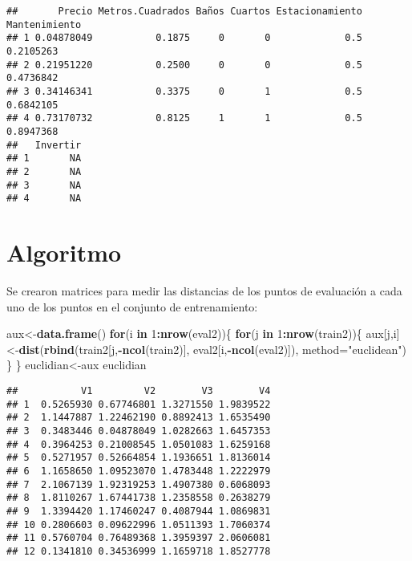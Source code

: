 \documentclass[]{article}
\newenvironment{Shaded}{\begin{snugshade}}{\end{snugshade}}
\newcommand{\KeywordTok}[1]{\textcolor[rgb]{0.13,0.29,0.53}{\textbf{#1}}}
\newcommand{\DataTypeTok}[1]{\textcolor[rgb]{0.13,0.29,0.53}{#1}}
\newcommand{\DecValTok}[1]{\textcolor[rgb]{0.00,0.00,0.81}{#1}}
\newcommand{\StringTok}[1]{\textcolor[rgb]{0.31,0.60,0.02}{#1}}
\newcommand{\ControlFlowTok}[1]{\textcolor[rgb]{0.13,0.29,0.53}{\textbf{#1}}}
\newcommand{\OperatorTok}[1]{\textcolor[rgb]{0.81,0.36,0.00}{\textbf{#1}}}
\newcommand{\NormalTok}[1]{#1}
\begin{document}
\begin{verbatim}
##       Precio Metros.Cuadrados Baños Cuartos Estacionamiento Mantenimiento
## 1 0.04878049           0.1875     0       0             0.5     0.2105263
## 2 0.21951220           0.2500     0       0             0.5     0.4736842
## 3 0.34146341           0.3375     0       1             0.5     0.6842105
## 4 0.73170732           0.8125     1       1             0.5     0.8947368
##   Invertir
## 1       NA
## 2       NA
## 3       NA
## 4       NA
\end{verbatim}

\section{Algoritmo}\label{algoritmo}

Se crearon matrices para medir las distancias de los puntos de
evaluación a cada uno de los puntos en el conjunto de entrenamiento:

\begin{Shaded}
\begin{Highlighting}[]
\NormalTok{aux<-}\KeywordTok{data.frame}\NormalTok{()}
\ControlFlowTok{for}\NormalTok{(i }\ControlFlowTok{in} \DecValTok{1}\OperatorTok{:}\KeywordTok{nrow}\NormalTok{(eval2))\{}
  \ControlFlowTok{for}\NormalTok{(j }\ControlFlowTok{in} \DecValTok{1}\OperatorTok{:}\KeywordTok{nrow}\NormalTok{(train2))\{}
\NormalTok{    aux[j,i]<-}\KeywordTok{dist}\NormalTok{(}\KeywordTok{rbind}\NormalTok{(train2[j,}\OperatorTok{-}\KeywordTok{ncol}\NormalTok{(train2)], eval2[i,}\OperatorTok{-}\KeywordTok{ncol}\NormalTok{(eval2)]), }\DataTypeTok{method=}\StringTok{"euclidean"}\NormalTok{)    }
\NormalTok{  \}}
\NormalTok{\}}
\NormalTok{euclidian<-aux}
\NormalTok{euclidian}
\end{Highlighting}
\end{Shaded}

\begin{verbatim}
##           V1         V2        V3        V4
## 1  0.5265930 0.67746801 1.3271550 1.9839522
## 2  1.1447887 1.22462190 0.8892413 1.6535490
## 3  0.3483446 0.04878049 1.0282663 1.6457353
## 4  0.3964253 0.21008545 1.0501083 1.6259168
## 5  0.5271957 0.52664854 1.1936651 1.8136014
## 6  1.1658650 1.09523070 1.4783448 1.2222979
## 7  2.1067139 1.92319253 1.4907380 0.6068093
## 8  1.8110267 1.67441738 1.2358558 0.2638279
## 9  1.3394420 1.17460247 0.4087944 1.0869831
## 10 0.2806603 0.09622996 1.0511393 1.7060374
## 11 0.5760704 0.76489368 1.3959397 2.0606081
## 12 0.1341810 0.34536999 1.1659718 1.8527778
\end{verbatim}
\end{document}
